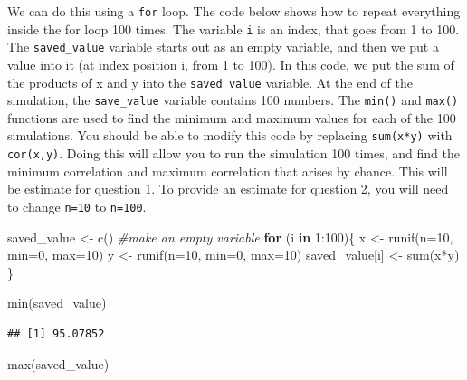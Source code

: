 \documentclass[
]{book}
\newenvironment{Shaded}{\begin{snugshade}}{\end{snugshade}}
\newcommand{\AttributeTok}[1]{\textcolor[rgb]{0.77,0.63,0.00}{#1}}
\newcommand{\CommentTok}[1]{\textcolor[rgb]{0.56,0.35,0.01}{\textit{#1}}}
\newcommand{\ControlFlowTok}[1]{\textcolor[rgb]{0.13,0.29,0.53}{\textbf{#1}}}
\newcommand{\DecValTok}[1]{\textcolor[rgb]{0.00,0.00,0.81}{#1}}
\newcommand{\FunctionTok}[1]{\textcolor[rgb]{0.00,0.00,0.00}{#1}}
\newcommand{\NormalTok}[1]{#1}
\newcommand{\OtherTok}[1]{\textcolor[rgb]{0.56,0.35,0.01}{#1}}
\newcommand{\SpecialCharTok}[1]{\textcolor[rgb]{0.00,0.00,0.00}{#1}}
\begin{document}
We can do this using a \texttt{for} loop. The code below shows how to repeat everything inside the for loop 100 times. The variable \texttt{i} is an index, that goes from 1 to 100. The \texttt{saved\_value} variable starts out as an empty variable, and then we put a value into it (at index position i, from 1 to 100). In this code, we put the sum of the products of x and y into the \texttt{saved\_value} variable. At the end of the simulation, the \texttt{save\_value} variable contains 100 numbers. The \texttt{min()} and \texttt{max()} functions are used to find the minimum and maximum values for each of the 100 simulations. You should be able to modify this code by replacing \texttt{sum(x*y)} with \texttt{cor(x,y)}. Doing this will allow you to run the simulation 100 times, and find the minimum correlation and maximum correlation that arises by chance. This will be estimate for question 1. To provide an estimate for question 2, you will need to change \texttt{n=10} to \texttt{n=100}.

\begin{Shaded}
\begin{Highlighting}[]
\NormalTok{saved\_value }\OtherTok{\textless{}{-}} \FunctionTok{c}\NormalTok{() }\CommentTok{\#make an empty variable}
\ControlFlowTok{for}\NormalTok{ (i }\ControlFlowTok{in} \DecValTok{1}\SpecialCharTok{:}\DecValTok{100}\NormalTok{)\{}
\NormalTok{  x }\OtherTok{\textless{}{-}} \FunctionTok{runif}\NormalTok{(}\AttributeTok{n=}\DecValTok{10}\NormalTok{, }\AttributeTok{min=}\DecValTok{0}\NormalTok{, }\AttributeTok{max=}\DecValTok{10}\NormalTok{)}
\NormalTok{  y }\OtherTok{\textless{}{-}} \FunctionTok{runif}\NormalTok{(}\AttributeTok{n=}\DecValTok{10}\NormalTok{, }\AttributeTok{min=}\DecValTok{0}\NormalTok{, }\AttributeTok{max=}\DecValTok{10}\NormalTok{)}
\NormalTok{  saved\_value[i] }\OtherTok{\textless{}{-}} \FunctionTok{sum}\NormalTok{(x}\SpecialCharTok{*}\NormalTok{y)}
\NormalTok{\}}

\FunctionTok{min}\NormalTok{(saved\_value)}
\end{Highlighting}
\end{Shaded}

\begin{verbatim}
## [1] 95.07852
\end{verbatim}

\begin{Shaded}
\begin{Highlighting}[]
\FunctionTok{max}\NormalTok{(saved\_value)}
\end{Highlighting}
\end{Shaded}
\end{document}
